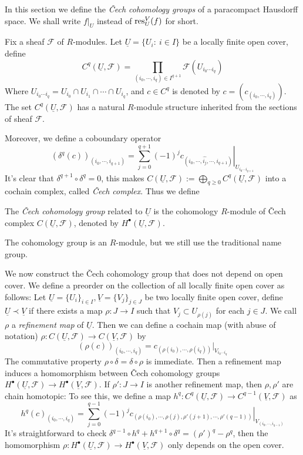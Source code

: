 In this section we define the \emph{\v{C}ech cohomology groups} of a paracompact Hausdorff space.
We shall write $f|_U$ instead of $\operatorname{res}^V_U(f)$ for short.

Fix a sheaf $\mathcal{F}$ of $R$-modules.
Let $\underline{U}=\{U_i:\ i\in I\}$ be a locally finite open cover, define
\[C^q(\underline{U},\mathcal{F})=\prod_{(i_0,\cdots,i_q)\in I^{q+1}}\mathcal{F}(U_{i_0\cdots i_q})\]
Where $U_{i_0\cdots i_q}=U_{i_0}\cap U_{i_1}\cap\cdots\cap U_{i_q}$, and $c\in C^q$ is denoted by $c=\left(c_{(i_0,\cdots,i_q)}\right)$.
The set $C^q(\underline{U},\mathcal{F})$ has a natural $R$-module structure inherited from the sections of sheaf $\mathcal{F}$.

Moreover, we define a coboundary operator
\[(\delta^q(c))_{(i_0,\cdots,i_{q+1})}=\sum_{j=0}^{q+1}(-1)^j\left.c_{(i_0,\cdots,\widehat{i_j},\cdots,i_{q+1})}\right|_{U_{i_0\cdots i_{q+1}}}\]
It's clear that $\delta^{q+1}\circ\delta^q=0$, this makes $C(\underline{U},\mathcal{F}):=\bigoplus_{q\geq 0}C^q(\underline{U},\mathcal{F})$ into a cochain complex, called \emph{\v{C}ech complex}.
Thus we define

\begin{defn}
    The \emph{\v{C}ech cohomology group} related to $\underline{U}$ is the cohomology $R$-module of \v{C}ech complex $C(\underline{U},\mathcal{F})$, denoted by $H^\bullet(\underline{U},\mathcal{F})$.
\end{defn}

The cohomology group is an $R$-module, but we still use the traditional name group.

We now construct the \v{C}ech cohomology group that does not depend on open cover.
We define a preorder on the collection of all locally finite open cover as follows:
Let $\underline{U}=\{U_i\}_{i\in I},\underline{V}=\{V_j\}_{j\in J}$ be two locally finite open cover, define $\underline{U}\prec\underline{V}$ if there exists a map $\rho:J\to I$ such that $V_j\subset U_{\rho(j)}$ for each $j\in J$.
We call $\rho$ a \emph{refinement map} of $\underline{U}$.
Then we can define a cochain map (with abuse of notation) $\rho:C(\underline{U},\mathcal{F})\to C(\underline{V},\mathcal{F})$ by
\[(\rho(c))_{(i_0,\cdots,i_q)}=c_{(\rho(i_0),\cdots,\rho(i_q))}|_{V_{i_0\cdots i_q}}\]
The commutative property $\rho\circ\delta=\delta\circ\rho$ is immediate.
Then a refinement map induces a homomorphism between \v{C}ech cohomology groups $H^\bullet(\underline{U},\mathcal{F})\to H^\bullet(\underline{V},\mathcal{F})$.
If $\rho':J\to I$ is another refinement map, then $\rho,\rho'$ are chain homotopic:
To see this, we define a map $h^q:C^q(\underline{U},\mathcal{F})\to C^{q-1}(\underline{V},\mathcal{F})$ as
\[h^q(c)_{(i_0,\cdots,i_q)}=\sum_{j=0}^{q-1}(-1)^j\left.c_{(\rho(i_0),\cdots,\rho(j),\rho'(j+1),\cdots,\rho'(q-1))}\right|_{V_{(i_0,\cdots,i_{q-1})}}\]
It's straightforward to check $\delta^{q-1}\circ h^q+h^{q+1}\circ\delta^q=(\rho')^q-\rho^q$, then the homomorphism $\rho:H^\bullet(\underline{U},\mathcal{F})\to H^\bullet(\underline{V},\mathcal{F})$ only depends on the open cover.

